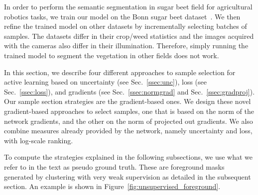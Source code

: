 \documentclass[letterpaper, 10 pt, conference]{ieeeconf}  %
\def\secref#1{Sec.~\ref{#1}}
\begin{document}
In order to perform the semantic segmentation in sugar beet field for agricultural robotics tasks,
we train our model on the Bonn sugar beet dataset~\cite{chebrolu2017agricultural}. We then refine the trained model on other datasets by incrementally selecting batches of samples. The datasets differ in their crop/weed statistics and the images acquired with the cameras also differ in their illumination. Therefore, simply running the trained model to segment the vegetation in other fields does not work.

In this section, we describe four different approaches to sample selection for active learning based on uncertainty (see \secref{ssec:unc}), loss (see \secref{ssec:loss}), and gradients (see \secref{ssec:normgrad} and \secref{ssec:gradproj}).
Our  sample section strategies are the gradient-based ones.
We design these novel gradient-based approaches to select samples, one that is based on the norm of the network gradients, and the other on the norm of projected out gradients. We also combine measures already provided by the network, namely uncertainty and loss, with log-scale ranking. 



   


To compute the strategies explained in the following subsections, we use what we refer to in the text as pseudo ground truth. These are foreground masks generated by clustering with very weak supervision as detailed in the subsequent section. An example is shown in Figure~\ref{fig:unsupervised_foreground}.
\end{document}
